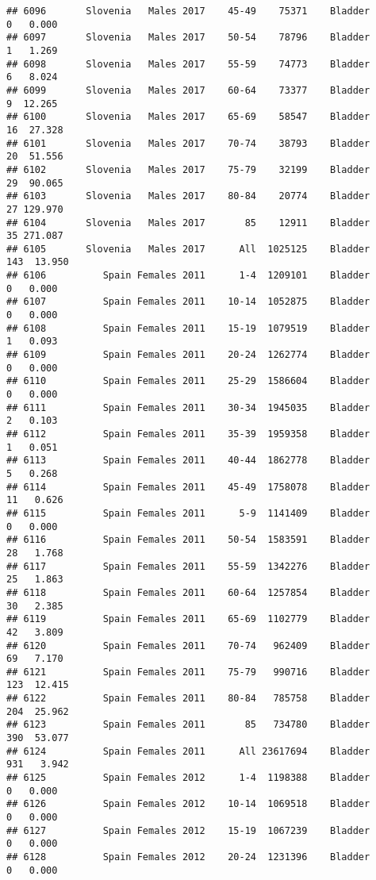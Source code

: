\documentclass[
]{article}
\begin{document}
\begin{verbatim}
## 6096       Slovenia   Males 2017    45-49    75371    Bladder      0   0.000
## 6097       Slovenia   Males 2017    50-54    78796    Bladder      1   1.269
## 6098       Slovenia   Males 2017    55-59    74773    Bladder      6   8.024
## 6099       Slovenia   Males 2017    60-64    73377    Bladder      9  12.265
## 6100       Slovenia   Males 2017    65-69    58547    Bladder     16  27.328
## 6101       Slovenia   Males 2017    70-74    38793    Bladder     20  51.556
## 6102       Slovenia   Males 2017    75-79    32199    Bladder     29  90.065
## 6103       Slovenia   Males 2017    80-84    20774    Bladder     27 129.970
## 6104       Slovenia   Males 2017       85    12911    Bladder     35 271.087
## 6105       Slovenia   Males 2017      All  1025125    Bladder    143  13.950
## 6106          Spain Females 2011      1-4  1209101    Bladder      0   0.000
## 6107          Spain Females 2011    10-14  1052875    Bladder      0   0.000
## 6108          Spain Females 2011    15-19  1079519    Bladder      1   0.093
## 6109          Spain Females 2011    20-24  1262774    Bladder      0   0.000
## 6110          Spain Females 2011    25-29  1586604    Bladder      0   0.000
## 6111          Spain Females 2011    30-34  1945035    Bladder      2   0.103
## 6112          Spain Females 2011    35-39  1959358    Bladder      1   0.051
## 6113          Spain Females 2011    40-44  1862778    Bladder      5   0.268
## 6114          Spain Females 2011    45-49  1758078    Bladder     11   0.626
## 6115          Spain Females 2011      5-9  1141409    Bladder      0   0.000
## 6116          Spain Females 2011    50-54  1583591    Bladder     28   1.768
## 6117          Spain Females 2011    55-59  1342276    Bladder     25   1.863
## 6118          Spain Females 2011    60-64  1257854    Bladder     30   2.385
## 6119          Spain Females 2011    65-69  1102779    Bladder     42   3.809
## 6120          Spain Females 2011    70-74   962409    Bladder     69   7.170
## 6121          Spain Females 2011    75-79   990716    Bladder    123  12.415
## 6122          Spain Females 2011    80-84   785758    Bladder    204  25.962
## 6123          Spain Females 2011       85   734780    Bladder    390  53.077
## 6124          Spain Females 2011      All 23617694    Bladder    931   3.942
## 6125          Spain Females 2012      1-4  1198388    Bladder      0   0.000
## 6126          Spain Females 2012    10-14  1069518    Bladder      0   0.000
## 6127          Spain Females 2012    15-19  1067239    Bladder      0   0.000
## 6128          Spain Females 2012    20-24  1231396    Bladder      0   0.000

\end{verbatim}
\end{document}
